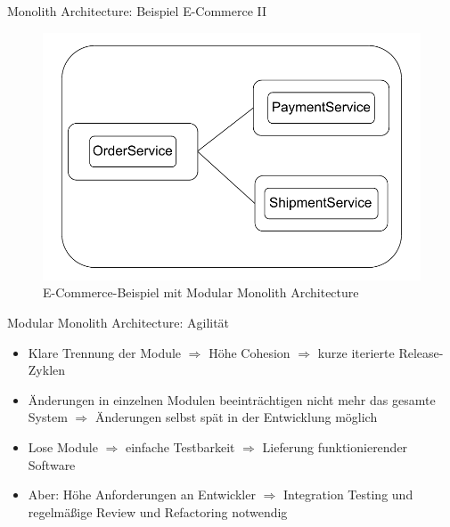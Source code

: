 \begin{frame}{Monolith Architecture: Beispiel E-Commerce II}
    \begin{figure}[!h]
        \centering
        \includegraphics[scale=0.55]{imglib/mono/mono-example}
        \caption{E-Commerce-Beispiel mit Modular Monolith Architecture}
        \label{fig:mono-modular}
    \end{figure}
\end{frame}

\begin{frame}{Modular Monolith Architecture: Agilität}
    \begin{itemize}
      \item Klare Trennung der Module $\Rightarrow$ Höhe Cohesion $\Rightarrow$ kurze iterierte Release-Zyklen
      \item Änderungen in einzelnen Modulen beeinträchtigen nicht mehr das gesamte System $\Rightarrow$ Änderungen selbst spät in der Entwicklung möglich
      \item Lose Module $\Rightarrow$ einfache Testbarkeit $\Rightarrow$ Lieferung funktionierender Software
      \item Aber: Höhe Anforderungen an Entwickler $\Rightarrow$ Integration Testing und regelmäßige Review und Refactoring notwendig
    \end{itemize}
\end{frame}
